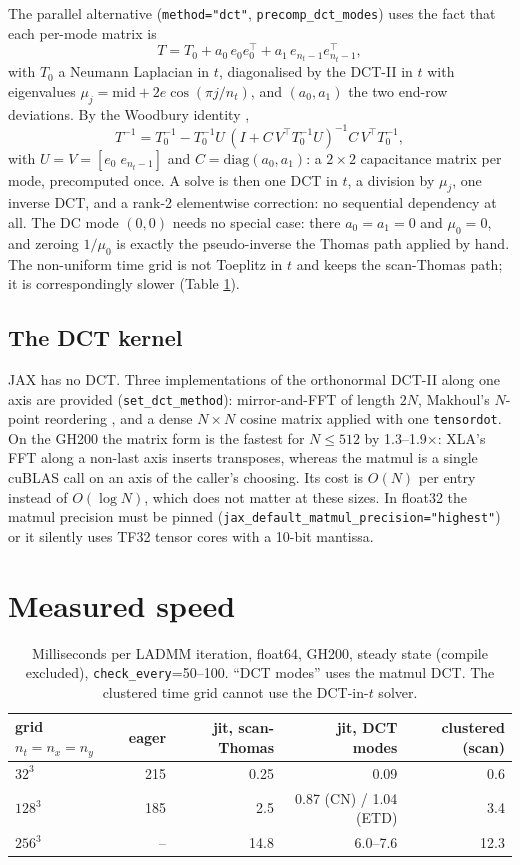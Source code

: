 \documentclass[11pt]{article}
\newcommand{\code}[1]{\texttt{#1}}
\begin{document}
The parallel alternative (\code{method="dct"}, \code{precomp\_dct\_modes}) uses the fact
that each per-mode matrix is
\[
  T = T_0 + a_0\, e_0 e_0^{\!\top} + a_1\, e_{n_t-1} e_{n_t-1}^{\!\top},
\]
with $T_0$ a Neumann Laplacian in $t$, diagonalised by the DCT-II in $t$ with eigenvalues
$\mu_j = \mathrm{mid} + 2e\cos(\pi j/n_t)$, and $(a_0,a_1)$ the two end-row deviations. By
the Woodbury identity \cite{hager1989},
\[
  T^{-1} = T_0^{-1} - T_0^{-1} U\,(I + C\,V^{\!\top} T_0^{-1} U)^{-1} C\, V^{\!\top}
  T_0^{-1},
\]
with $U=V=[e_0\; e_{n_t-1}]$ and $C=\mathrm{diag}(a_0,a_1)$: a $2\times 2$ capacitance
matrix per mode, precomputed once. A solve is then one DCT in $t$, a division by $\mu_j$,
one inverse DCT, and a rank-2 elementwise correction: no sequential dependency at all.
The DC mode $(0,0)$ needs no special case: there $a_0=a_1=0$ and $\mu_0 = 0$, and
zeroing $1/\mu_0$ is exactly the pseudo-inverse the Thomas path applied by hand. The
non-uniform time grid is not Toeplitz in $t$ and keeps the scan-Thomas path; it is
correspondingly slower (Table \ref{tab:speed}).

\subsection{The DCT kernel}\label{sec:dct}

JAX has no DCT. Three implementations of the orthonormal DCT-II along one axis are
provided (\code{set\_dct\_method}): mirror-and-FFT of length $2N$, Makhoul's $N$-point
reordering \cite{makhoul1980}, and a dense $N\times N$ cosine matrix applied with one
\code{tensordot}. On the GH200 the matrix form is the fastest for $N\le 512$ by
1.3--1.9$\times$: XLA's FFT along a non-last axis inserts transposes, whereas the matmul
is a single cuBLAS call on an axis of the caller's choosing. Its cost is $O(N)$ per
entry instead of $O(\log N)$, which does not matter at these sizes. In float32 the matmul
precision must be pinned (\code{jax\_default\_matmul\_precision="highest"}) or it silently
uses TF32 tensor cores with a 10-bit mantissa.

\section{Measured speed}\label{sec:measure}

\begin{table}[h]
\centering
\begin{tabular}{lrrrr}
\toprule
grid $n_t=n_x=n_y$ & eager & jit, scan-Thomas & jit, DCT modes & clustered (scan) \\
\midrule
$32^3$  & 215 & 0.25 & 0.09 & 0.6 \\
$128^3$ & 185 & 2.5 & 0.87 (CN) / 1.04 (ETD) & 3.4 \\
$256^3$ & --  & 14.8 & 6.0--7.6 & 12.3 \\
\bottomrule
\end{tabular}
\caption{Milliseconds per LADMM iteration, float64, GH200, steady state (compile
excluded), \code{check\_every}=50--100. ``DCT modes'' uses the matmul DCT. The clustered
time grid cannot use the DCT-in-$t$ solver.}
\label{tab:speed}
\end{table}
\end{document}
